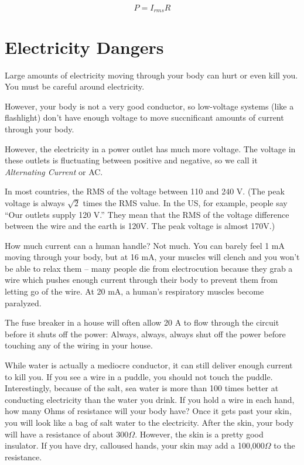 $$P = I_{rms} R$$

\section{Electricity Dangers}

Large amounts of electricity moving through your body can hurt or even kill
you. You must be careful around electricity.

However, your body is not a very good conductor, so low-voltage
systems (like a flashlight) don't have enough voltage to move succnificant amounts of
current through your body.

However, the  electricity in a power outlet has much more voltage. The voltage
in these outlets is fluctuating between positive and negative, so we
call it \textit{Alternating Current} or AC.

In most countries, the RMS of the voltage between 110 and 240 V. (The
peak voltage is always $\sqrt{2}$ times the RMS value. In the US, for
example, people say ``Our outlets supply 120 V.'' They mean that the
RMS of the voltage difference between the wire and the earth is 120V.
The peak voltage is almost 170V.)

How much current can a human handle? Not much. You can barely feel 1
mA moving through your body, but at 16 mA, your muscles will clench
and you won't be able to relax them -- many people die from
electrocution because they grab a wire which pushes enough current
through their body to prevent them from letting go of the wire.  At 20
mA, a human's respiratory muscles become paralyzed.

The fuse breaker in a house will often allow 20 A to flow through the
circuit before it shuts off the power: Always, always, always shut off
the power before touching any of the wiring in your house.

While water is actually a mediocre conductor, it can still deliver enough current
to kill you. If you see a wire in a puddle, you should not touch the
puddle. Interestingly, because of the salt, sea water is more than
100 times better at conducting electricity than the water you drink.
If you hold a wire in each hand, how many Ohms of resistance will your
body have? Once it gets past your skin, you will look like a bag of
salt water to the electricity. After the skin, your body will have a
resistance of about 300$\Omega$. However, the skin is a pretty good
insulator. If you have dry, calloused hands, your skin may add a
100,000$\Omega$ to the resistance.

